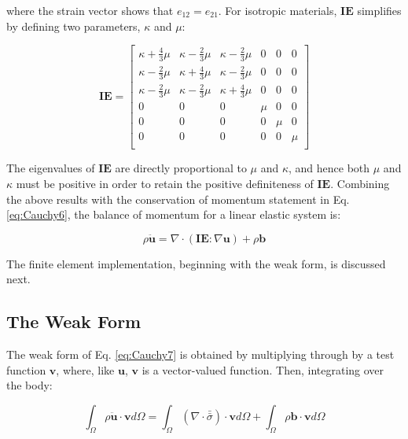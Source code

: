 \documentclass[10pt]{article}
\begin{document}
where the strain vector shows that \(e_{12}=e_{21}\). For isotropic materials, \(\textbf{IE}\) simplifies by defining two parameters, \(\kappa\) and \(\mu\):

\begin{equation}
\textbf{IE}=\begin{bmatrix}\kappa+\frac{4}{3}\mu & \kappa-\frac{2}{3}\mu & \kappa-\frac{2}{3}\mu & 0 & 0 & 0\\
\kappa-\frac{2}{3}\mu & \kappa+\frac{4}{3}\mu & \kappa-\frac{2}{3}\mu & 0 & 0 & 0\\
\kappa-\frac{2}{3}\mu & \kappa-\frac{2}{3}\mu & \kappa+\frac{4}{3}\mu & 0 & 0 & 0\\
0 & 0 & 0 & \mu & 0 & 0\\
0 & 0 & 0 & 0 & \mu & 0\\
0 & 0 & 0 & 0 & 0 & \mu\\
\end{bmatrix}
\end{equation}

The eigenvalues of \(\textbf{IE}\) are directly proportional to \(\mu\) and \(\kappa\), and hence both \(\mu\) and \(\kappa\) must be positive in order to retain the positive definiteness of \(\textbf{IE}\). Combining the above results with the conservation of momentum statement in Eq. \eqref{eq:Cauchy6}, the balance of momentum for a linear elastic system is:

\begin{equation}
\label{eq:Cauchy7}
\rho\ddot{\textbf{u}}=\nabla\cdot(\textbf{IE}:\nabla \textbf{u})+\rho\textbf{b}
\end{equation}

The finite element implementation, beginning with the weak form, is discussed next.

\subsection{The Weak Form}

The weak form of Eq. \eqref{eq:Cauchy7} is obtained by multiplying through by a test function \(\textbf{v}\), where, like \(\textbf{u}\), \(\textbf{v}\) is a vector-valued function. Then, integrating over the body:

\begin{equation}
\label{eq:StrongForm2}
\int_{\Omega}\rho\ddot{\textbf{u}}\cdot \textbf{v}d\Omega=\int_{\Omega}(\nabla\cdot\bar{\bar{\sigma}})\cdot\textbf{v}d\Omega+\int_{\Omega}\rho\textbf{b}\cdot\textbf{v}d\Omega
\end{equation}
\end{document}
